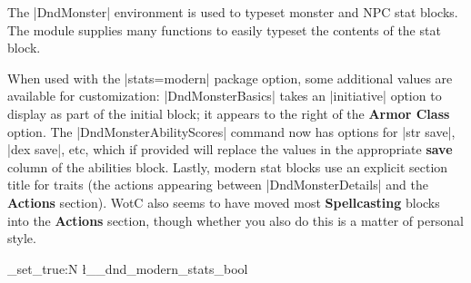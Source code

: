 \documentclass[letterpaper,twocolumn,openany,nodeprecatedcode]{dndbook}
\begin{document}
The |DndMonster| environment is used to typeset monster and NPC stat blocks. The module supplies many functions to easily typeset the contents of the stat block.

When used with the |stats=modern| package option, some additional values are available for customization: |DndMonsterBasics| takes an |initiative| option to display as part of the initial block; it appears to the right of the \textbf{Armor Class} option. The |DndMonsterAbilityScores| command now has options for |str save|, |dex save|, etc, which if provided will replace the values in the appropriate \textbf{save} column of the abilities block. Lastly, modern stat blocks use an explicit section title for traits (the actions appearing between |DndMonsterDetails| and the \textbf{Actions} section). WotC also seems to have moved most \textbf{Spellcasting} blocks into the \textbf{Actions} section, though whether you also do this is a matter of personal style.


\ExplSyntaxOn
\let\DndMonster\DndMonsterModernBg
\let\endDndMonster\endDndMonsterModernBg
\bool_set_true:N \l__dnd_modern_stats_bool
\ExplSyntaxOff
\end{document}
